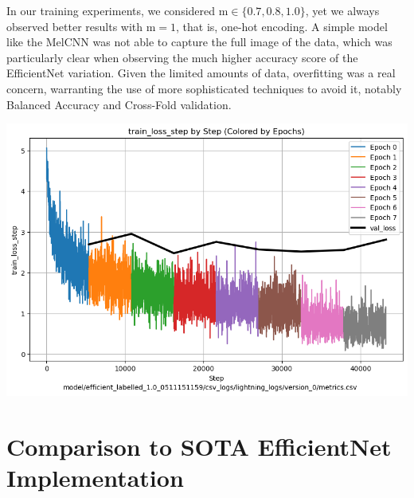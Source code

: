 \documentclass[10pt]{article}
\begin{document}
\begin{minipage}{0.48\linewidth}

In our training experiments, we considered $\text{m} \in \{0.7, 0.8, 1.0\}$, yet we always observed better results with $\text{m} = 1$, that is, one-hot encoding. A simple model like the MelCNN was not able to capture the full image of the data, which was particularly clear when observing the much higher accuracy score of the EfficientNet variation. Given the limited amounts of data, overfitting was a real concern, warranting the use of more sophisticated techniques to avoid it, notably Balanced Accuracy and Cross-Fold validation.
\end{minipage}
\hfill
\begin{minipage}{0.48\linewidth}
  \includegraphics[width=\linewidth]{img/efficient_loss_accuracy_plot.png}
\end{minipage}


\section*{Comparison to SOTA EfficientNet Implementation}
\end{document}
